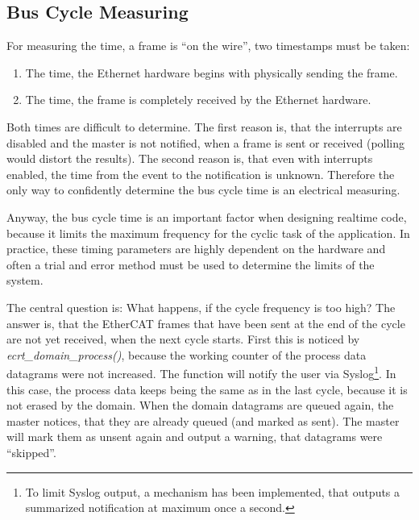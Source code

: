 \documentclass[a4paper,12pt,BCOR6mm,bibtotoc,idxtotoc]{scrbook}
\begin{document}

\subsection{Bus Cycle Measuring}
\label{sec:timing-bus}

For measuring the time, a frame is ``on the wire'', two timestamps must be
taken:

\begin{enumerate}

\item The time, the Ethernet hardware begins with physically sending the
frame.

\item The time, the frame is completely received by the Ethernet hardware.

\end{enumerate}

Both times are difficult to determine. The first reason is, that the
interrupts are disabled and the master is not notified, when a frame is sent
or received (polling would distort the results). The second reason is, that
even with interrupts enabled, the time from the event to the notification is
unknown. Therefore the only way to confidently determine the bus cycle time is
an electrical measuring.

Anyway, the bus cycle time is an important factor when designing realtime
code, because it limits the maximum frequency for the cyclic task of the
application.  In practice, these timing parameters are highly dependent on the
hardware and often a trial and error method must be used to determine the
limits of the system.

The central question is: What happens, if the cycle frequency is too high? The
answer is, that the EtherCAT frames that have been sent at the end of the
cycle are not yet received, when the next cycle starts.  First this is noticed
by \textit{ecrt\_domain\_process()}, because the working counter of the
process data datagrams were not increased. The function will notify the user
via Syslog\footnote{To limit Syslog output, a mechanism has been implemented,
that outputs a summarized notification at maximum once a second.}. In this
case, the process data keeps being the same as in the last cycle, because it
is not erased by the domain. When the domain datagrams are queued again, the
master notices, that they are already queued (and marked as sent). The master
will mark them as unsent again and output a warning, that datagrams were
``skipped''.
\end{document}
